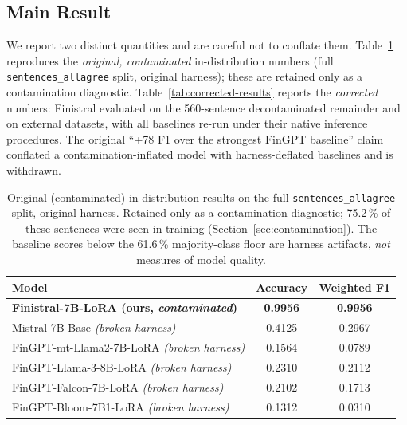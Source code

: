 \documentclass[a4paper]{article}
\begin{document}
\subsection{Main Result}

We report two distinct quantities and are careful not to conflate them. Table~\ref{tab:test-results} reproduces the \emph{original, contaminated} in-distribution numbers (full \texttt{sentences\_allagree} split, original harness); these are retained only as a contamination diagnostic. Table~\ref{tab:corrected-results} reports the \emph{corrected} numbers: Finistral evaluated on the 560-sentence decontaminated remainder and on external datasets, with all baselines re-run under their native inference procedures. The original ``+78 F1 over the strongest FinGPT baseline'' claim conflated a contamination-inflated model with harness-deflated baselines and is withdrawn.

\begin{table}[htbp]
\centering
\caption{Original (contaminated) in-distribution results on the full \texttt{sentences\_allagree} split, original harness. Retained only as a contamination diagnostic; 75.2\,\% of these sentences were seen in training (Section~\ref{sec:contamination}). The baseline scores below the 61.6\,\% majority-class floor are harness artifacts, \emph{not} measures of model quality.}
\label{tab:test-results}
\begin{tabular}{lcc}
\toprule
\textbf{Model} & \textbf{Accuracy} & \textbf{Weighted F1} \\
\midrule
\textbf{Finistral-7B-LoRA (ours, \emph{contaminated})} & \textbf{0.9956} & \textbf{0.9956} \\
Mistral-7B-Base \emph{(broken harness)}                    & 0.4125          & 0.2967 \\
FinGPT-mt-Llama2-7B-LoRA \emph{(broken harness)}          & 0.1564          & 0.0789 \\
FinGPT-Llama-3-8B-LoRA \emph{(broken harness)}            & 0.2310          & 0.2112 \\
FinGPT-Falcon-7B-LoRA \emph{(broken harness)}             & 0.2102          & 0.1713 \\
FinGPT-Bloom-7B1-LoRA \emph{(broken harness)}             & 0.1312          & 0.0310 \\
\bottomrule
\end{tabular}
\end{table}
\end{document}
